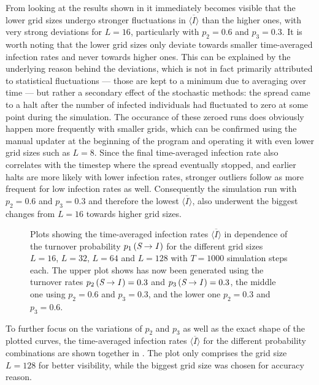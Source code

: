 From looking at the results shown in  it immediately becomes visible that the lower grid sizes undergo stronger fluctuations in $\overline{\langle I\rangle}$ than the higher ones, 
with very strong deviations for $L=16$, particularly with $p_2=0.6$ and $p_3=0.3$. It is worth noting that the lower grid sizes only deviate towards smaller time-averaged infection rates and never towards higher ones. 
This can be explained by the underlying reason behind the deviations, which is not in fact primarily attributed to statistical fluctuations --- those are kept to a minimum due to averaging over time --- but
rather a secondary effect of the stochastic methods: the spread came to a halt after the number of infected individuals had fluctuated to zero at some point during the simulation. The occurance of these zeroed runs does
obviously happen more frequently with smaller grids, which can be confirmed using the manual updater at the beginning of the program and operating it with even lower grid sizes such as $L=8$.
Since the final time-averaged infection rate also correlates with the timestep where the spread eventually stopped, and earlier halts are more likely with lower infection rates, stronger outliers follow as more frequent 
for low infection rates as well. Consequently the simulation run with $p_2=0.6$ and $p_3=0.3$ and therefore the lowest $\overline{\langle I\rangle}$, also underwent the biggest changes from $L=16$ towards higher grid sizes.

\begin{figure}[ht]
    \centering
    \resizebox{\textwidth}{!}{}
    \caption{Plots showing the time-averaged infection rates $\overline{\langle I\rangle}$ in dependence of the turnover probability $p_1\left(\textit{S}\rightarrow\textit{I}\,\right)$
    for the different grid sizes $L=16$, $L=32$, $L=64$ and $L=128$ with $T=1000$ simulation steps each. The upper plot shows has now been generated using the turnover rates 
    $p_2\left(\textit{S}\rightarrow\textit{I}\,\right)=0.3$ and $p_3\left(\textit{S}\rightarrow\textit{I}\,\right)=0.3$, 
    the middle one using $p_2=0.6$ and $p_3=0.3$, and the lower one $p_2=0.3$ and $p_3=0.6$.}\label{fig:Res_Dis_Avg_Inf_over_p1}
\end{figure}

To further focus on the variations of $p_2$ and $p_3$ as well as the exact shape of the plotted curves, the time-averaged infection rates $\overline{\langle I\rangle}$ for the different probability combinations are 
shown together in . The plot only comprises the grid size $L=128$ for better visibility, while the biggest grid size was chosen for accuracy reason. 

